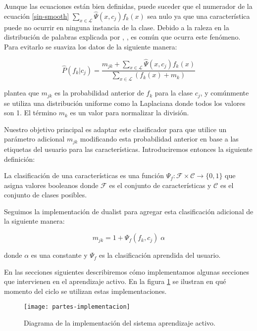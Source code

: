 Aunque las ecuaciones están bien definidas, puede suceder que el numerador de la ecuación \ref{sin-smooth} $\sum_{x \in \mathcal{L}} \hat{\Psi}(x, c_j) f_k(x)$ sea nulo ya que una característica puede no ocurrir en ninguna instancia de la clase. Debido a la raleza en la distribución de palabras explicada por \citet{zipf1}, \citet{zipf2}, es común que ocurra este fenómeno. Para evitarlo se suaviza los datos de la siguiente manera:

\begin{equation}
\hat{P}(f_k|c_j) = \frac{m_{jk} + \sum_{x \in \mathcal{L}} \hat{\Psi}(x, c_j) f_k(x)}{\sum_{x \in \mathcal{L}} (f_k(x) + m_k)}
\end{equation}

\citet{dualist} plantea que $m_{jk}$ es la probabilidad anterior de $f_k$ para la clase $c_j$, y comúnmente se utiliza una distribución uniforme como la Laplaciana donde todos los valores son 1. El término $m_k$ es un valor para normalizar la división.

Nuestro objetivo principal es adaptar este clasificador para que utilice un parámetro adicional $m_{jk}$ modificando esta probabilidad anterior en base a las etiquetas del usuario para las características. Introduciremos entonces la siguiente definición:

\begin{definition}
La clasificación de una características es una función $\Psi_f:\mathcal{F} \times \mathcal{C} \rightarrow \{0, 1\}$ que asigna valores booleanos donde $\mathcal{F}$ es el conjunto de características y $\mathcal{C}$ es el conjunto de clases posibles.
\end{definition}

Seguimos la implementación de dualist para agregar esta clasificación adicional de la siguiente manera:

\begin{equation}\label{eq-feat-boost}
m_{jk} = 1 + \Psi_f(f_k, c_j) \; \alpha
\end{equation}

donde $\alpha$ es una constante y $\Psi_f$ es la clasificación aprendida del usuario.

\vspace{5 mm}
En las secciones siguientes describiremos cómo implementamos algunas secciones que intervienen en el aprendizaje activo. En la figura \ref{aa-con-secciones} se ilustran en qué momento del ciclo se utilizan estas implementaciones.

\begin{figure}[h!]\label{aa-con-secciones}
\centering
\texttt{[image: partes-implementacion]}
\caption{Diagrama de la implementación del sistema aprendizaje activo.}
\end{figure}

